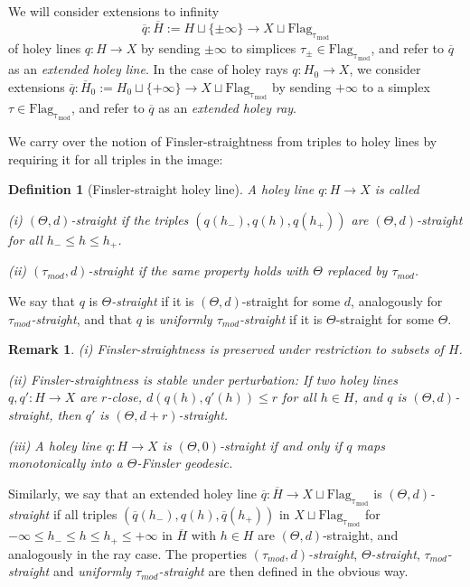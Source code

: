 \documentclass[12pt]{article}
\theoremstyle{boldplain}
\theoremstyle{bolddefinition}
\newtheorem{definition}[equation]{Definition}
\newtheorem{rem}[equation]{Remark}
\numberwithin{equation}{section}
\def\Flagt{\operatorname{Flag_{\tau_{mod}}}}
\def\ol{\overline}
\def\taumod{\tau_{mod}}
\begin{document}
We will consider extensions to infinity $$\ol q:\ol H:=H\sqcup\{\pm\infty\}\to X\sqcup\Flagt$$ 
of holey lines $q:H\to X$
by sending $\pm\infty$ to simplices $\tau_{\pm}\in\Flagt$, 
and refer to $\ol q$ as an {\em extended holey line}.
In the case of holey rays $q:H_0\to X$,
we consider extensions $\ol q:\ol H_0:=H_0\sqcup\{+\infty\}\to X\sqcup\Flagt$ 
by sending $+\infty$ to a simplex $\tau\in\Flagt$,
and refer to $\ol q$ as an {\em extended holey ray}.

We carry over the notion of Finsler-straightness from triples to holey lines 
by requiring it for all triples in the image:
\begin{definition}[Finsler-straight holey line] 
\label{def:fstrspm}
A holey line $q:H\to X$ is called 

(i) {\em $(\Theta,d)$-straight} if the triples $(q(h_-), q(h), q(h_+))$ 
are $(\Theta,d)$-straight for all $h_-\leq h\leq h_+$.

(ii) {\em $(\taumod,d)$-straight} if the same property holds with $\Theta$ replaced by $\taumod$.
\end{definition}

We say that $q$ is {\em $\Theta$-straight} if it is $(\Theta,d)$-straight for some $d$,
analogously for {\em $\taumod$-straight},
and that $q$ is {\em uniformly $\taumod$-straight} if it is $\Theta$-straight for some $\Theta$.

\begin{rem}
\label{rem:fstr}
(i) 
Finsler-straightness is preserved under restriction to subsets of $H$. 

(ii) 
Finsler-straightness is stable under perturbation:
If two holey lines $q,q':H\to X$ are $r$-close,
$d(q(h),q'(h))\leq r$ for all $h\in H$,
and $q$ is $(\Theta,d)$-straight,
then $q'$ is $(\Theta,d+r)$-straight.

(iii)
A holey line $q:H\to X$ is $(\Theta,0)$-straight
if and only if $q$ maps monotonically into a $\Theta$-Finsler geodesic.
\end{rem}

Similarly, we say that 
an extended holey line $\ol q:\ol H\to X\sqcup\Flagt$ is {\em $(\Theta,d)$-straight} 
if all triples $(\ol q(h_-),q(h),\ol q(h_+))$ in $X\sqcup\Flagt$ 
for $-\infty\leq h_-\leq h\leq h_+\leq +\infty$ in $\ol H$ with 
$h\in H$ 
are $(\Theta,d)$-straight,
and analogously in the ray case.
The properties 
{\em $(\taumod,d)$-straight}, {\em $\Theta$-straight}, {\em $\taumod$-straight} and {\em uniformly $\taumod$-straight}
are then defined in the obvious way.
\end{document}
